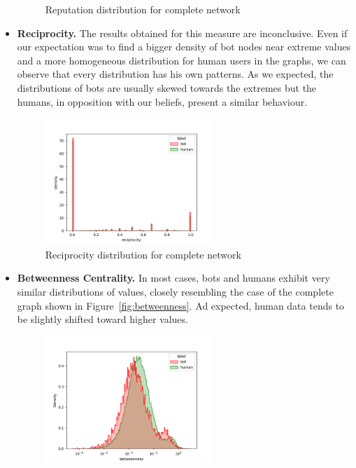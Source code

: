 \documentclass[12pt, a4paper]{article}
\begin{document}
\begin{itemize}
\begin{figure}[H]
                    \caption{Reputation distribution for complete network}
                \end{figure}
			\item \textbf{Reciprocity.} The results obtained for this measure are inconclusive. Even if our expectation was to find a bigger density of bot nodes near extreme values and a more homogeneous distribution for human users in the graphs, we can observe that every distribution has his own patterns. As we expected, the distributions of bots are usually skewed towards the extremes but the humans, in opposition with our beliefs, present a similar behaviour.
				\begin{figure}[H]
                	\centering
                    \includegraphics[width=0.6\textwidth]{results/complete_reciprocity.png}
                    \caption{Reciprocity distribution for complete network}
                \end{figure}
			\item \textbf{Betweenness Centrality.} In most cases, bots and humans exhibit very similar distributions of values, closely resembling the case of the complete graph shown in Figure~\ref{fig:betweenness}. Ad expected, human data tends to be slightly shifted toward higher values.
                \begin{figure}[H]
                    \centering
                    \includegraphics[width=0.6\textwidth]{results/complete_betweenness.png}

\end{figure}
\end{itemize}
\end{document}
